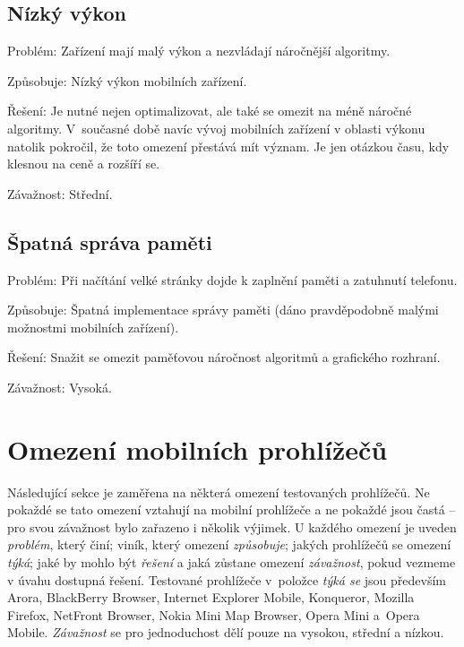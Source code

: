 \subsection{Nízký výkon}
\begin{description*}
\item[Problém:] Zařízení mají malý výkon a nezvládají náročnější algoritmy.
\item[Způsobuje:] Nízký výkon mobilních zařízení.
\item[Řešení:] Je nutné nejen optimalizovat, ale také se omezit na méně náročné algoritmy. V~současné době navíc vývoj mobilních zařízení v oblasti výkonu natolik pokročil, že toto omezení přestává mít význam. Je jen otázkou času, kdy klesnou na ceně a rozšíří se.
\item[Závažnost:] Střední.
\end{description*}

\subsection{Špatná správa paměti}
\begin{description*}
\item[Problém:] Při načítání velké stránky dojde k zaplnění paměti a zatuhnutí telefonu.
\item[Způsobuje:] Špatná implementace správy paměti (dáno pravděpodobně malými možnostmi mobilních zařízení).
\item[Řešení:] Snažit se omezit paměťovou náročnost algoritmů a grafického rozhraní.
\item[Závažnost:] Vysoká.
\end{description*}

\section{Omezení mobilních prohlížečů}
\label{sec:omezeniProhlizecu}
Následující sekce je zaměřena na některá omezení testovaných prohlížečů. Ne pokaždé se tato omezení vztahují na mobilní prohlížeče a ne pokaždé jsou častá -- pro svou závažnost bylo zařazeno i několik výjimek. U každého omezení je uveden \emph{problém}, který činí; viník, který omezení \emph{způsobuje}; jakých prohlížečů se omezení \emph{týká}; jaké by mohlo být \emph{řešení} a jaká zůstane omezení \emph{závažnost}, pokud vezmeme v úvahu dostupná řešení. Testované prohlížeče v~položce \emph{týká se} jsou především Arora, BlackBerry Browser, Internet Explorer Mobile, Konqueror, Mozilla Firefox, NetFront Browser, Nokia Mini Map Browser, Opera Mini a~Opera Mobile. \emph{Závažnost} se pro jednoduchost dělí pouze na vysokou, střední a nízkou.

